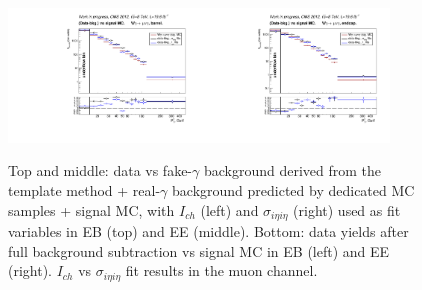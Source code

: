 \begin{figure}[htb]
\begin{center}
\includegraphics[width=0.45\textwidth]{../figs/figs_v11/MUON_WGamma/PrepareYields/c_BkgSubtrDATAvsSIGMC_c_MUON_WGamma__UNblind__Barrel__phoEt.pdf}\includegraphics[width=0.45\textwidth]{../figs/figs_v11/MUON_WGamma/PrepareYields/c_BkgSubtrDATAvsSIGMC_c_MUON_WGamma__UNblind__Endcap__phoEt.pdf}\\
  \caption{Top and middle: data vs fake-$\gamma$ background derived from the template method + real-$\gamma$ background predicted by dedicated MC samples + signal MC, with $I_{ch}$ (left) and $\sigma_{i\eta i\eta}$ (right) used as fit variables in EB (top) and EE (middle). Bottom: data yields after full background subtraction vs signal MC in EB (left) and EE (right). $I_{ch}$ vs $\sigma_{i\eta i\eta}$ fit results in the muon channel.}
  \label{fig:DDvsMC_Wg_Data_MUON}
  \end{center}
\end{figure}

